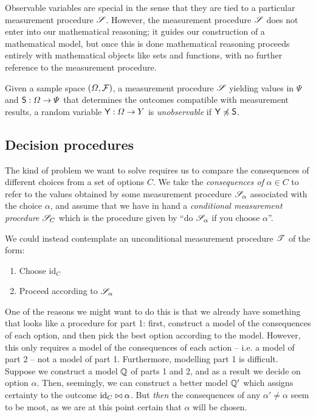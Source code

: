 Observable variables are special in the sense that they are tied to a particular measurement procedure $\mathscr{S}$. However, the measurement procedure $\mathscr{S}$ does not enter into our mathematical reasoning; it guides our construction of a mathematical model, but once this is done mathematical reasoning proceeds entirely with mathematical objects like sets and functions, with no further reference to the measurement procedure.

\begin{definition}\label{def:unobserved_variable}
Given a sample space $(\Omega,\mathcal{F})$, a measurement procedure $\mathscr{S}$ yielding values in $\Psi$ and $\mathsf{S}:\Omega\to\Psi$ that determines the outcomes compatible with measurement results, a random variable $\mathsf{Y}:\Omega\to Y$ is \emph{unobservable} if $\mathsf{Y}\not\preccurlyeq \mathsf{S}$.
\end{definition}

\subsection{Decision procedures}\label{sec:actions}

The kind of problem we want to solve requires us to compare the consequences of different choices from a set of options $C$. We take the \emph{consequences of} $\alpha\in C$ to refer to the values obtained by some measurement procedure $\mathscr{S}_\alpha$ associated with the choice $\alpha$, and assume that we have in hand a \emph{conditional measurement procedure} $\mathscr{S}_C$ which is the procedure given by ``do $\mathscr{S}_\alpha$ if you choose $\alpha$''.

We could instead contemplate an unconditional measurement procedure $\mathscr{T}$ of the form:
\begin{enumerate}
    \item Choose $\mathrm{id}_C$
    \item Proceed according to $\mathscr{S}_\alpha$
\end{enumerate}
One of the reasons we might want to do this is that we already have something that looks like a procedure for part 1: first, construct a model of the consequences of each option, and then pick the best option according to the model. However, this only requires a model of the consequences of each action -- i.e. a model of part 2 -- not a model of part 1. Furthermore, modelling part 1 is difficult. Suppose we construct a model $\mathbb{Q}$ of parts 1 and 2, and as a result we decide on option $\alpha$. Then, seemingly, we can construct a better model $\mathbb{Q}'$ which assigns certainty to the outcome $\mathrm{id}_C\bowtie\alpha$. But \emph{then} the consequences of any $\alpha'\neq \alpha$ seem to be moot, as we are at this point certain that $\alpha$ will be chosen.


